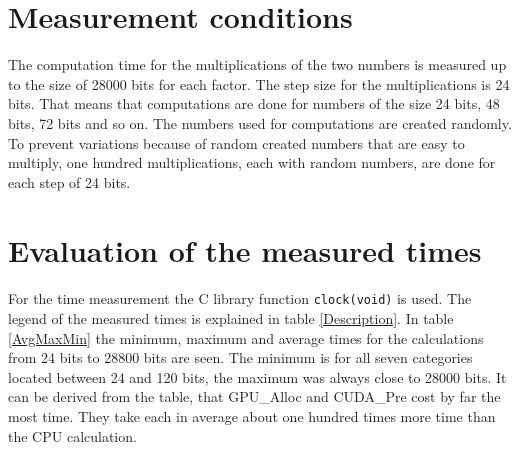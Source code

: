 \documentclass[12pt,a4paper]{article}
\begin{document}
\section{Measurement conditions}
The computation time for the multiplications of the two numbers is measured up to the size of 28000 bits for each factor. The step size for the multiplications is 24 bits. That means that computations are done for numbers of the size 24 bits, 48 bits, 72 bits and so on. The numbers used for computations are created randomly. To prevent variations because of random created numbers that are easy to multiply, one hundred multiplications, each with random numbers, are done for each step of 24 bits.

\section{Evaluation of the measured times}
For the time measurement the C library function \texttt{clock(void)} is used. The legend of the measured times is explained in table \ref{Description}. In table \ref{AvgMaxMin} the minimum, maximum and average times for the calculations from 24 bits to 28800 bits are seen. The minimum is for all seven categories located between 24 and 120 bits, the maximum was always close to 28000 bits. It can be derived from the table, that GPU\_Alloc and CUDA\_Pre cost by far the most time. They take each in average about one hundred times more time than the CPU calculation.
\end{document}
